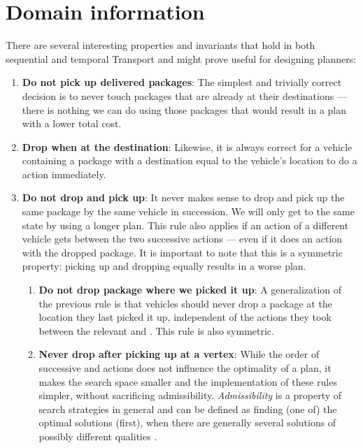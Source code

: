 \section{Domain information}\label{domain-info}

There are several interesting properties and invariants that hold in both sequential and temporal Transport and might prove useful for designing planners:
\begin{enumerate}
\item \textbf{Do not pick up delivered packages}: The simplest and trivially correct decision is to never touch packages that are already at their destinations --- there is nothing
we can do using those packages that would result in a plan with a lower total cost.

\item \textbf{Drop when at the destination}: Likewise, it is
always correct for a vehicle containing a package with a destination equal
to the vehicle's location to do a \drop{} action immediately.

\item \textbf{Do not drop and pick up}: It never makes sense to drop and pick up
the same package by the same vehicle in succession. We will only get to the same state
by using a longer plan. This rule also applies if an action of a different vehicle
gets between the two successive actions --- even if it does an action with the
dropped package.
It is important to note that this is a symmetric property: picking up and dropping
equally results in a worse plan.
\begin{enumerate}
\item \textbf{Do not drop package where we picked it up}: A generalization
of the previous rule is that vehicles should never drop a package
at the location they last picked it up, independent of the actions they took
between the relevant \pickup{} and \drop{}. This rule is also symmetric.

\item \textbf{Never drop after picking up at a vertex}:
While the order of successive \pickup{} and \drop{} actions does not
influence the optimality of a plan, it makes the search space smaller and the implementation of these rules simpler,
without sacrificing admissibility. \textit{Admissibility} is
a property of search strategies in general and can be defined as finding
(one of) the optimal solutions (first), when there are generally several solutions
of possibly different qualities \citep[Section~3.5]{Russell1995}.
\end{enumerate}


\end{enumerate}
